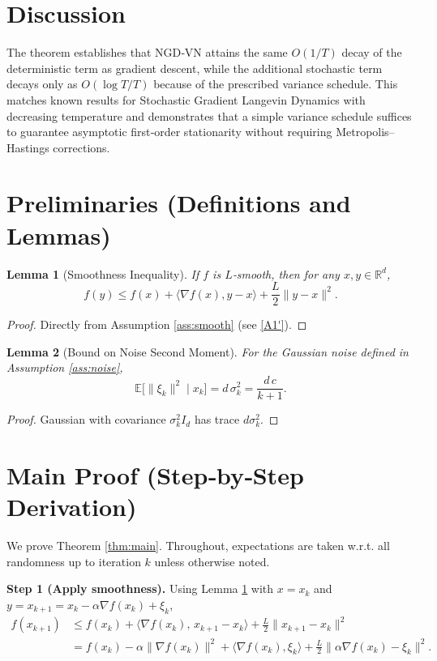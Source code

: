 \documentclass{article}
\newtheorem{lemma}{Lemma}
\newcommand{\E}{\mathbb{E}}
\newcommand{\R}{\mathbb{R}}
\begin{document}
\section*{Discussion}
The theorem establishes that NGD‑VN attains the same $O(1/T)$ decay of the deterministic term as gradient descent, while the additional stochastic term decays only as $O(\log T/T)$ because of the prescribed variance schedule. This matches known results for Stochastic Gradient Langevin Dynamics with decreasing temperature and demonstrates that a simple variance schedule suffices to guarantee asymptotic first‑order stationarity without requiring Metropolis–Hastings corrections.

\newpage
\section*{Preliminaries (Definitions and Lemmas)}
\begin{lemma}[Smoothness Inequality]\label{lem:smooth}
If $f$ is $L$‑smooth, then for any $x,y\in\R^{d}$,
\[
f(y)\le f(x)+\langle\nabla f(x),y-x\rangle+\frac{L}{2}\|y-x\|^{2}.
\]
\end{lemma}
\begin{proof}
Directly from Assumption \ref{ass:smooth} (see \eqref{A1'}). \hfill\qedsymbol
\end{proof}

\begin{lemma}[Bound on Noise Second Moment]\label{lem:noise}
For the Gaussian noise defined in Assumption \ref{ass:noise},
\[
\E\!\big[\|\xi_{k}\|^{2}\mid x_{k}\big]=d\,\sigma_{k}^{2}=\frac{d\,c}{k+1}.
\]
\end{lemma}
\begin{proof}
Gaussian with covariance $\sigma_{k}^{2}I_{d}$ has trace $d\sigma_{k}^{2}$. \hfill\qedsymbol
\end{proof}

\section*{Main Proof (Step‑by‑Step Derivation)}
We prove Theorem \ref{thm:main}. Throughout, expectations are taken w.r.t. all randomness up to iteration $k$ unless otherwise noted.

\noindent\textbf{Step 1 (Apply smoothness).}  
Using Lemma \ref{lem:smooth} with $x=x_{k}$ and $y=x_{k+1}=x_{k}-\alpha\nabla f(x_{k})+\xi_{k}$,
\begin{align}
f(x_{k+1})
&\le f(x_{k})+\big\langle\nabla f(x_{k}),\,x_{k+1}-x_{k}\big\rangle
      +\frac{L}{2}\|x_{k+1}-x_{k}\|^{2} \nonumber\\
&= f(x_{k})-\alpha\|\nabla f(x_{k})\|^{2}
   +\big\langle\nabla f(x_{k}),\xi_{k}\big\rangle
   +\frac{L}{2}\big\|\alpha\nabla f(x_{k})-\xi_{k}\big\|^{2}.
\tag{4}\label{eq:smooth}
\end{align}
\end{document}
